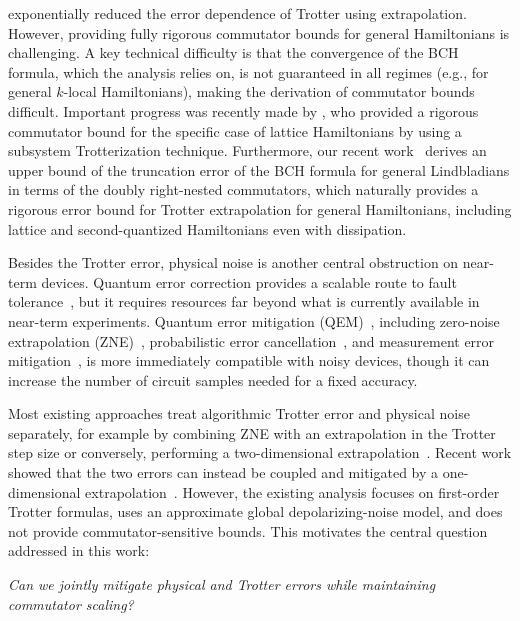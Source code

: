 \documentclass[aps,pra,reprint,groupedaddress,floatfix]{revtex4-2}
\begin{document}
\citet{watson2025exponentially} exponentially reduced the error dependence of Trotter using extrapolation. However, providing fully rigorous commutator bounds for general Hamiltonians is challenging. A key technical difficulty is that the convergence of the BCH formula, which the analysis relies on, is not guaranteed in all regimes (e.g., for general $k$-local Hamiltonians), making the derivation of commutator bounds difficult. Important progress was recently made by \citet{mizuta2025commutator}, who provided a rigorous commutator bound for the specific case of lattice Hamiltonians by using a subsystem Trotterization technique.
Furthermore, our recent work~\cite{wang2026lindbladiansimulationcommutatorbounds} derives an upper bound of the truncation error of the BCH formula for general Lindbladians in terms of the doubly right-nested commutators, which naturally provides a rigorous error bound for Trotter extrapolation for general Hamiltonians, including lattice and second-quantized Hamiltonians even with dissipation.

Besides the Trotter error, physical noise is another central obstruction on near-term devices. Quantum error correction provides a scalable route to fault tolerance~\cite{Terhal_2015}, but it requires resources far beyond what is currently available in near-term experiments. Quantum error mitigation (QEM)~\cite{cai2023quantum}, including zero-noise extrapolation (ZNE)~\cite{li2017efficient, PhysRevLett.119.180509}, probabilistic error cancellation~\cite{EndoBenjaminLi2018, berg_probabilistic_2023}, and measurement error mitigation~\cite{Bravyi2021measurement, Nation2021scalable}, is more immediately compatible with noisy devices, though it can increase the number of circuit samples needed for a fixed accuracy.


Most existing approaches treat algorithmic Trotter error and physical noise separately, for example by combining ZNE with an extrapolation in the Trotter step size or conversely, performing a two-dimensional extrapolation~\cite{vazquez2023well}. Recent work showed that the two errors can instead be coupled and mitigated by a one-dimensional extrapolation~\cite{hakkaku2025dataefficienterrormitigationphysical}. However, the existing analysis focuses on first-order Trotter formulas, uses an approximate global depolarizing-noise model, and does not provide commutator-sensitive bounds. This motivates the central question addressed in this work:
\begin{center}
\begin{minipage}{0.95\columnwidth}
\centering\textit{Can we jointly mitigate physical and Trotter errors while maintaining commutator scaling?}
\end{minipage}
\end{center}
\end{document}
